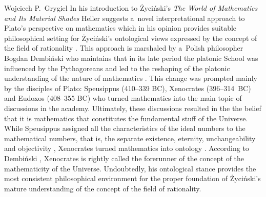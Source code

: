\begin{artengenv}{Wojciech P.~Grygiel}
In his introduction to Życiński's \textit{The World of Mathematics and Its Material Shades} Heller suggests a~novel interpretational approach to Plato's perspective on mathematics which in his opinion provides suitable philosophical setting for Życiński's ontological views expressed by the concept of the field of rationality
\parencite[][pp.5–15]{zycinski_swiat_2013}. %
 This approach is marshaled by a~Polish philosopher Bogdan Dembiński who maintains that in its late period the platonic School was influenced by the Pythagoreans and led to the reshaping of the platonic understanding of the nature of mathematics 
\parencites[][]{dembinski_pozna_2003}[][]{dembinski_pozny_2010}[][]{dembinski_o_2015}[][]{dembinski_u_2017}[][]{dembinski_theory_2019}. %
 This change was prompted mainly by the disciples of Plato: Speusippus (410--339 BC), Xenocrates (396--314~BC) and Eudoxos (408--355 BC) who turned mathematics into the main topic of discussions in the academy. Ultimately, these discussions resulted in the the belief that it is mathematics that constitutes the fundamental stuff of the Universe. While Speusippus assigned all the characteristics of the ideal numbers to the mathematical numbers, that is, the separate existence, eternity, unchangeability and objectivity 
\parencite[][pp.109–138]{dembinski_pozny_2010}, %
 Xenocrates turned mathematics into ontology 
\parencite[][pp.139–170]{dembinski_pozny_2010}. %
 According to Dembiński 
\parencite*[][p.158]{dembinski_pozny_2010}, %
 Xenocrates is rightly called the forerunner of the concept of the mathematicity of the Universe. Undoubtedly, his ontological stance provides the most consistent philosophical environment for the proper foundation of Życiński's mature understanding of the concept of the field of rationality.


\end{artengenv}
